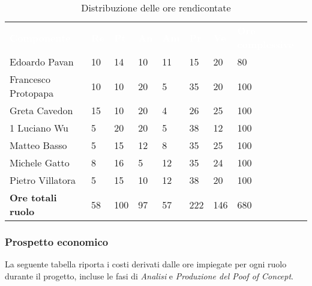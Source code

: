 \begin{table}[H]
	\begin{center}
	\renewcommand{\arraystretch}{1.25}
	\begin{tabular}{ m{}<{\centering}  m{}<{\centering} m{}<{\centering} m{}<{\centering}  m{}<{\centering}  m{}<{\centering}  m{}<{\centering}  m{}<{\centering}   }
		\rowcolor{darkblue}
		\textcolor{white}{\textbf{Componente}} &\textcolor{white}{\textbf{Re}}&\textcolor{white}{\textbf{Pt}}&\textcolor{white}{\textbf{An}}&\textcolor{white}{\textbf{Am}}&\textcolor{white}{\textbf{Pr}}&\textcolor{white}{\textbf{Ve}}&\textcolor{white}{\textbf{Ore complessive}}\\ 
		Edoardo Pavan & 10 & 14 & 10 & 11 & 15 & 20 & 80 \\	
		
		Francesco Protopapa & 10 & 10 & 20 & 5 & 35 & 20 & 100 \\
	
		Greta Cavedon & 15 & 10 & 20 & 4 & 26 & 25 & 100 \\
		1
		Luciano Wu & 5 & 20 & 20 & 5 & 38 & 12 & 100 \\
		
		Matteo Basso & 5 & 15 & 12 & 8 & 35 & 25 & 100 \\
		
		Michele Gatto & 8 & 16 & 5 & 12 & 35 & 24 & 100 \\
		
		Pietro Villatora & 5 & 15 & 10 & 12 & 38 & 20 & 100 \\
		
		\textbf{Ore totali ruolo} & 58 & 100 & 97 & 57 & 222 & 146 & 680 \\
	
	\end{tabular}
	\caption{Distribuzione delle ore rendicontate}
	\end{center}
	\end{table}

\subsubsection{Prospetto economico}
La seguente tabella riporta i costi derivati dalle ore impiegate per ogni ruolo durante il progetto, incluse le fasi di \textit{Analisi} e \textit{Produzione del Poof of Concept}.

